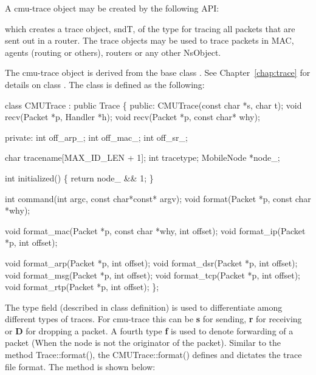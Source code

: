 A cmu-trace object may be created by the following API:

which creates a trace object, sndT, of the type  for tracing all packets that are sent out in a router. The trace objects may be used to trace packets in MAC, agents (routing or others), routers or any other NsObject. 

The cmu-trace object  is derived from the base class . See Chapter~\ref{chap:trace} for details on class . The class  is defined as the following:

\begin{program}
class CMUTrace : public Trace \{
public:
	CMUTrace(const char *s, char t);
	void	recv(Packet *p, Handler *h);
	void	recv(Packet *p, const char* why);

private:
	int off_arp_;
	int off_mac_;
	int off_sr_;

	char	tracename[MAX_ID_LEN + 1];
        int     tracetype;
        MobileNode *node_;

        int initialized() \{ return node_ && 1; \}

	int	command(int argc, const char*const* argv);
	void	format(Packet *p, const char *why);

	void	format_mac(Packet *p, const char *why, int offset);
	void	format_ip(Packet *p, int offset);

	void	format_arp(Packet *p, int offset);
	void	format_dsr(Packet *p, int offset);
	void	format_msg(Packet *p, int offset);
	void	format_tcp(Packet *p, int offset);
	void	format_rtp(Packet *p, int offset);
\};
\end{program}

The type field (described in  class definition) is used to
differentiate among different types of traces. For cmu-trace this can be
{\bf s} for sending, {\bf r} for receiving or {\bf D} for dropping a
packet. A fourth type {\bf f} is used to denote forwarding of a packet
(When the node is not the originator of the packet). 
Similar to the method Trace::format(), the CMUTrace::format() defines and
dictates the trace file format. The method is shown below: 

